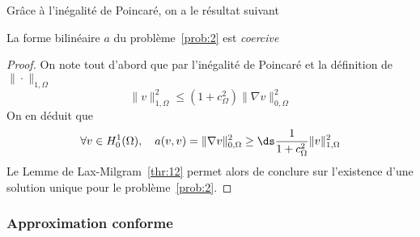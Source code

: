 Grâce à l'inégalité de Poincaré, on a le résultat suivant
\begin{proposition}
  \label{prop:7}
  La forme bilinéaire $a$ du problème~\ref{prob:2} est \emph{coercive}

  \begin{proof}
    On note tout d'abord que par l'inégalité de Poincaré et la définition de
    $\|\cdot\|_{1,\Omega}$
    \begin{equation}
      \label{eq:68}
      \|v\|^2_{1,\Omega} \le (1 + c^2_\Omega) \|\nabla v\|^2_{0,\Omega}
    \end{equation}
    On en déduit que
    \begin{equation}
      \label{eq:67}
      \forall v \in H^1_0(\Omega),\quad a(v,v) = \|\nabla v\|^2_{0,\Omega} \ge
      \ds \frac{1}{1+c^2_\Omega} \|v\|^2_{1,\Omega}
    \end{equation}
    Le Lemme de Lax-Milgram~\ref{thr:12} permet alors de conclure sur l'existence d'une
    solution unique pour le problème~\ref{prob:2}.
  \end{proof}
\end{proposition}

\subsubsection{Approximation conforme}
\label{sec:appr-conf}

